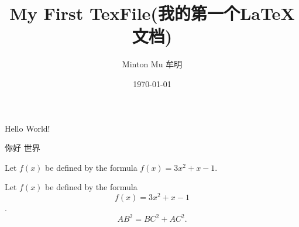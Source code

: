 \documentclass{ctexart} %
\title{My First TexFile(我的第一个LaTeX文档)}   %
\author{Minton Mu 牟明}          %
\date{\today}               %
\begin{document}
\maketitle
 Hello World!

 你好 世界

 Let $f(x)$ be defined by the formula $f(x)=3x^2+x-1$.

 Let $f(x)$ be defined by the formula $$f(x)=3x^2+x-1$$.
 \begin{equation}
     AB^2 = BC^2 + AC^2.
 \end{equation}
\end{document}

